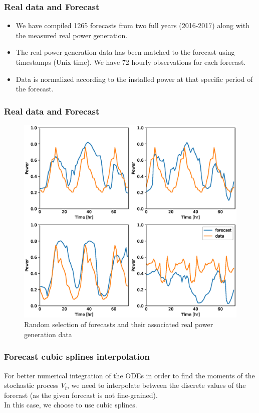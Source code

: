 \documentclass[aspectratio=169]{beamer}\usepackage[utf8]{inputenc}
\begin{document}
\begin{frame}\frametitle{ Real data and Forecast  }
\begin{itemize}
\item We have compiled 1265 forecasts from two full years (2016-2017) along with the measured real power generation.
\item The real power generation data has been matched to the forecast using timestamps (Unix time). 
We have 72 hourly observations for each forecast.
\item Data is normalized according to the installed power at that specific period of the forecast.
\end{itemize}

\end{frame}




\begin{frame}\frametitle{  Real data and Forecast }
\begin{figure}
    \includegraphics[scale=0.3]{Figures/forecast_data.eps}
  \caption{ Random selection of forecasts and their associated real power generation data }
\end{figure}
\end{frame}


\begin{frame}\frametitle{ Forecast cubic splines interpolation }

For better numerical integration of the ODEs in order to find the moments of the stochastic process $V_t$, we need to interpolate between the discrete values of the forecast (as the given forecast is not fine-grained). \\


In this case, we choose to use cubic splines.

\end{frame}
\end{document}
